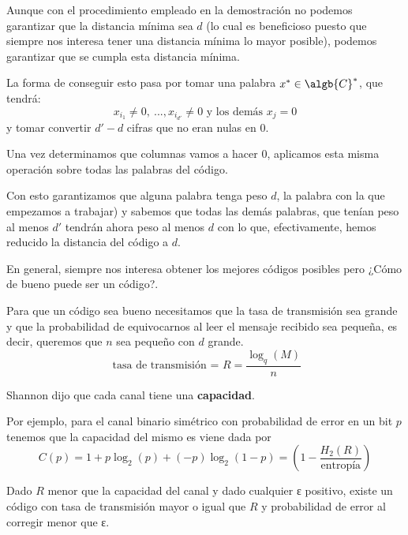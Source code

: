 Aunque con el procedimiento empleado en la demostración no podemos garantizar que la distancia mínima sea $d$ (lo cual es beneficioso puesto que siempre nos interesa tener una distancia mínima lo mayor posible), podemos garantizar que se cumpla esta distancia mínima.

La forma de conseguir esto pasa por tomar una palabra $x^*\in \algb{C}^*$, que tendrá:
\[x_{i_1}\neq 0, \ ..., x_{i_{d'}}\neq 0 \text{ y los demás } x_j=0\]
y tomar convertir $d'-d$ cifras que no eran nulas en 0.

Una vez determinamos que columnas vamos a hacer 0, aplicamos esta misma operación sobre todas las palabras del código.

Con esto garantizamos que alguna palabra tenga peso $d$, la palabra con la que empezamos a trabajar) y sabemos que todas las demás palabras, que tenían peso al menos $d'$ tendrán ahora peso al menos $d$ con lo que, efectivamente, hemos reducido la distancia del código a $d$.


En general, siempre nos interesa obtener los mejores códigos posibles pero ¿Cómo de bueno puede ser un código?.

Para que un código sea bueno necesitamos que la tasa de transmisión sea grande y que la probabilidad de equivocarnos al leer el mensaje recibido sea pequeña, es decir, queremos que $n$ sea pequeño con $d$ grande.
\[\text{ tasa de transmisión = } R = \frac{\log_q(M)}{n}\]

Shannon dijo que cada canal tiene una \textbf{capacidad}.

Por ejemplo, para el canal binario simétrico con probabilidad de error en un bit $p$ tenemos que la capacidad del mismo es viene dada por
\[C(p)=1+p\log_2(p)+(-p)\log_2(1-p)=\left(1-\frac{H_2(R)}{\text{entropía}}\right)\]

\begin{theorem}
Dado $R$ menor que la capacidad del canal y dado cualquier ε positivo, existe un código con tasa de transmisión mayor o igual que $R$ y probabilidad de error al corregir menor que ε.
\end{theorem}